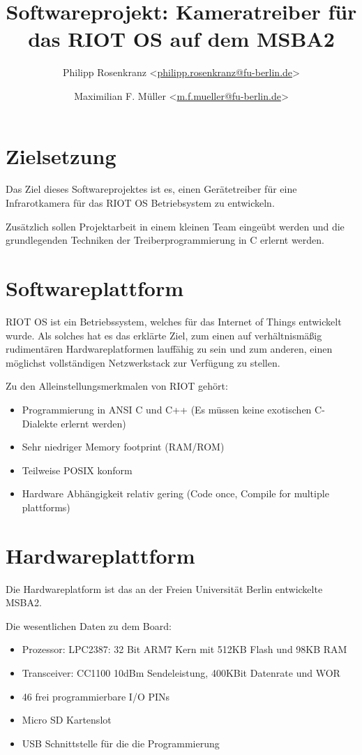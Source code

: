 \documentclass[10pt,a4paper]{article}
\title{Softwareprojekt: Kameratreiber für das RIOT OS auf dem MSBA2}
\author{Philipp Rosenkranz  \textless\href{mailto:philipp.rosenkranz@fu-berlin.de}{philipp.rosenkranz@fu-berlin.de}\textgreater
        \and Maximilian F. Müller \textless\href{mailto:m.f.mueller@fu-berlin.de}{m.f.mueller@fu-berlin.de}\textgreater}
\begin{document}
\maketitle

\section{Zielsetzung}

Das Ziel dieses Softwareprojektes ist es, einen Gerätetreiber für eine Infrarotkamera für das
RIOT OS Betriebsystem zu entwickeln.

Zusätzlich sollen Projektarbeit in einem kleinen Team eingeübt werden und die grundlegenden Techniken der Treiberprogrammierung in C erlernt werden.
\section{Softwareplattform}
RIOT OS ist ein Betriebssystem, welches für das Internet of Things entwickelt wurde.
Als solches hat es das erklärte Ziel, zum einen auf verhältnismäßig rudimentären Hardwareplatformen lauffähig zu sein und zum anderen, einen möglichst vollständigen Netzwerkstack zur Verfügung zu stellen.

Zu den Alleinstellungsmerkmalen von RIOT gehört:
\begin{itemize}
\item Programmierung in ANSI C und C++ (Es müssen keine exotischen C-Dialekte erlernt werden)
\item Sehr niedriger Memory footprint (RAM/ROM)
\item Teilweise POSIX konform
\item Hardware Abhängigkeit relativ gering (Code once, Compile for multiple plattforms)
\end{itemize}

\section{Hardwareplattform}
Die Hardwareplatform ist das an der Freien Universität Berlin entwickelte \mbox{MSBA2}. 

Die wesentlichen Daten zu dem Board:

\begin{itemize}
\item Prozessor: LPC2387: 32 Bit ARM7 Kern mit 512KB Flash und 98KB RAM
\item Transceiver: CC1100 10dBm Sendeleistung, 400KBit Datenrate und WOR 
\item 46 frei programmierbare I/O PINs
\item Micro SD Kartenslot 
\item USB Schnittstelle für die die Programmierung 

\end{itemize}
\end{document}
